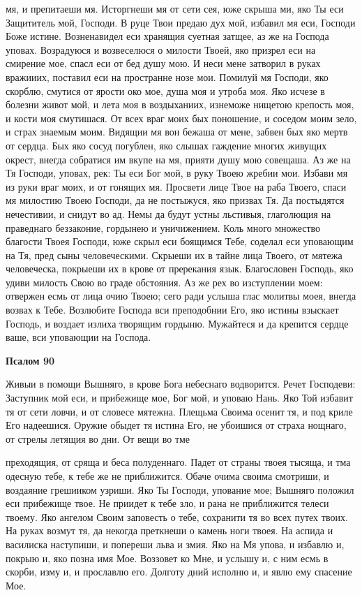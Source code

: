 мя, и препитаеши мя. Исторгнеши мя от сети сея, юже скрыша ми,
яко Ты еси Защититель мой, Господи. В руце Твои предаю дух мой,
избавил мя еси, Господи Боже истине. Возненавидел еси хранящия
суетная затщее, аз же на Господа уповах. Возрадуюся и возвеселюся о
милости Твоей, яко призрел еси на смирение мое, спасл еси от бед
душу мою. И неси мене затворил в руках вражииих, поставил еси на
пространне нозе мои. Помилуй мя Господи, яко скорблю, смутися
от ярости око мое, душа моя и утроба моя. Яко исчезе в болезни
живот мой, и лета моя в воздыханиих, изнеможе нищетою крепость
моя, и кости моя смутишася. От всех враг моих бых поношение, и
соседом моим зело, и страх знаемым моим. Видящии мя вон бежаша
от мене, забвен бых яко мертв от сердца. Бых яко сосуд погублен,
яко слышах гаждение многих живущих окрест, внегда собратися им
вкупе на мя, прияти душу мою совещаша. Аз же на Тя Господи,
уповах, рек: Ты еси Бог мой, в руку Твоею жребии мои. Избави мя
из руки враг моих, и от гонящих мя. Просвети лице Твое на раба
Твоего, спаси мя милостию Твоею Господи, да не постыжуся, яко
призвах Тя. Да постыдятся нечестивии, и снидут во ад. Немы да будут
устны льстивыя, глаголющия на праведнаго беззаконие, гордынею
и уничижением. Коль много множество благости Твоея Господи,
юже скрыл еси боящимся Тебе, соделал еси уповающим на Тя, пред
сыны человеческими. Скрыеши их в тайне лица Твоего, от мятежа
человеческа, покрыеши их в крове от пререкания язык. Благословен
Господь, яко удиви милость Свою во граде обстояния. Аз же рех во
изступлении моем: отвержен есмь от лица очию Твоею; сего ради услыша
глас молитвы моея, внегда возвах к Тебе. Возлюбите Господа вси
преподобнии Его, яко истины взыскает Господь, и воздает излиха творящим
гордыню. Мужайтеся и да крепится сердце ваше, вси уповающии на
Господа.






 

\bfseries Псалом 90\normalfont{}


   Живыи в помощи Вышняго, в крове Бога небеснаго водворится. Речет
Господеви: Заступник мой еси, и прибежище мое, Бог мой, и уповаю Нань.
Яко Той избавит тя от сети ловчи, и от словесе мятежна. Плещьма Своима
осенит тя, и под криле Его надеешися. Оружие обыдет тя истина Его, не
убоишися от страха нощнаго, от стрелы летящия во дни. От вещи во тме

преходящия, от сряща и беса полуденнаго. Падет от страны твоея тысяща, и
тма одесную тебе, к тебе же не приближится. Обаче очима своима смотриши,
и воздаяние грешииком узриши. Яко Ты Господи, упование мое; Вышняго
положил еси прибежище твое. Не приидет к тебе зло, и рана не приближится
телеси твоему. Яко ангелом Своим заповесть о тебе, сохранити тя
во всех путех твоих. На руках возмут тя, да некогда преткнеши о
камень ноги твоея. На аспида и василиска наступиши, и попереши
льва и змия. Яко на Мя упова, и избавлю и, покрыю и, яко позна
имя Мое. Воззовет ко Мне, и услышу и, с ним есмь в скорби, изму
и, и прославлю его. Долготу дний исполню и, и явлю ему спасение
Мое.


